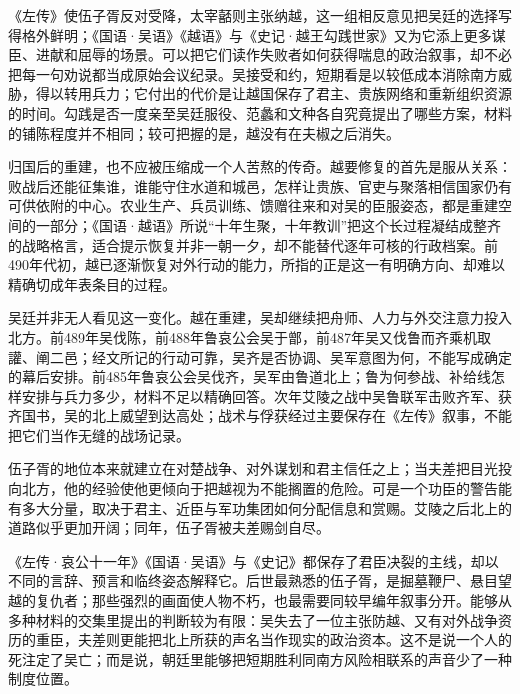 《左传》使伍子胥反对受降，太宰嚭则主张纳越，这一组相反意见把吴廷的选择写得格外鲜明；《国语·吴语》《越语》与《史记·越王勾践世家》又为它添上更多谋臣、进献和屈辱的场景。可以把它们读作失败者如何获得喘息的政治叙事，却不必把每一句劝说都当成原始会议纪录。吴接受和约，短期看是以较低成本消除南方威胁，得以转用兵力；它付出的代价是让越国保存了君主、贵族网络和重新组织资源的时间。勾践是否一度亲至吴廷服役、范蠡和文种各自究竟提出了哪些方案，材料的铺陈程度并不相同；较可把握的是，越没有在夫椒之后消失。

归国后的重建，也不应被压缩成一个人苦熬的传奇。越要修复的首先是服从关系：败战后还能征集谁，谁能守住水道和城邑，怎样让贵族、官吏与聚落相信国家仍有可供依附的中心。农业生产、兵员训练、馈赠往来和对吴的臣服姿态，都是重建空间的一部分；《国语·越语》所说“十年生聚，十年教训”把这个长过程凝结成整齐的战略格言，适合提示恢复并非一朝一夕，却不能替代逐年可核的行政档案。前490年代初，越已逐渐恢复对外行动的能力，所指的正是这一有明确方向、却难以精确切成年表条目的过程。

吴廷并非无人看见这一变化。越在重建，吴却继续把舟师、人力与外交注意力投入北方。前489年吴伐陈，前488年鲁哀公会吴于鄫，前487年吴又伐鲁而齐乘机取讙、阐二邑；经文所记的行动可靠，吴齐是否协调、吴军意图为何，不能写成确定的幕后安排。前485年鲁哀公会吴伐齐，吴军由鲁道北上；鲁为何参战、补给线怎样安排与兵力多少，材料不足以精确回答。次年艾陵之战中吴鲁联军击败齐军、获齐国书，吴的北上威望到达高处；战术与俘获经过主要保存在《左传》叙事，不能把它们当作无缝的战场记录。

伍子胥的地位本来就建立在对楚战争、对外谋划和君主信任之上；当夫差把目光投向北方，他的经验使他更倾向于把越视为不能搁置的危险。可是一个功臣的警告能有多大分量，取决于君主、近臣与军功集团如何分配信息和赏赐。艾陵之后北上的道路似乎更加开阔；同年，伍子胥被夫差赐剑自尽。

《左传·哀公十一年》《国语·吴语》与《史记》都保存了君臣决裂的主线，却以不同的言辞、预言和临终姿态解释它。后世最熟悉的伍子胥，是掘墓鞭尸、悬目望越的复仇者；那些强烈的画面使人物不朽，也最需要同较早编年叙事分开。能够从多种材料的交集里提出的判断较为有限：吴失去了一位主张防越、又有对外战争资历的重臣，夫差则更能把北上所获的声名当作现实的政治资本。这不是说一个人的死注定了吴亡；而是说，朝廷里能够把短期胜利同南方风险相联系的声音少了一种制度位置。

